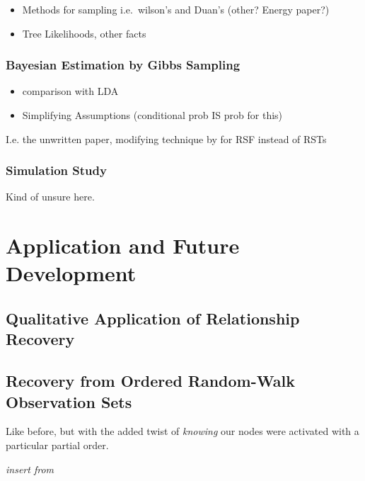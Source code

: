 \documentclass[%
	12pt,
		oneside,
		letterpaper
]{book}
\providecommand{\tightlist}{%
  \setlength{\itemsep}{0pt}\setlength{\parskip}{0pt}}\usepackage{longtable,booktabs,array}
\begin{document}
\begin{itemize}
\tightlist
\item
  Methods for sampling i.e.~wilson's and Duan's (other? Energy paper?)
\item
  Tree Likelihoods, other facts
\end{itemize}

\section{Bayesian Estimation by Gibbs
Sampling}\label{bayesian-estimation-by-gibbs-sampling}

\begin{itemize}
\tightlist
\item
  comparison with LDA
\item
  Simplifying Assumptions (conditional prob IS prob for this)
\end{itemize}

I.e. the unwritten paper, modifying technique by
\textcite{BayesianSpanningTree_Duan2021} for RSF instead of RSTs

\section{Simulation Study}\label{simulation-study-1}

Kind of unsure here.

\part{Application and Future Development}

\chapter{Qualitative Application of Relationship
Recovery}\label{qualitative-application-of-relationship-recovery}

\chapter{Recovery from Ordered Random-Walk Observation
Sets}\label{recovery-from-ordered-random-walk-observation-sets}

Like before, but with the added twist of \emph{knowing} our nodes were
activated with a particular partial order.

\emph{insert from
\autocite{OrganizingTaggedKnowledge_Sexton2020,UsingSemanticFluency_Sexton2019}}


\printbibliography
\end{document}

